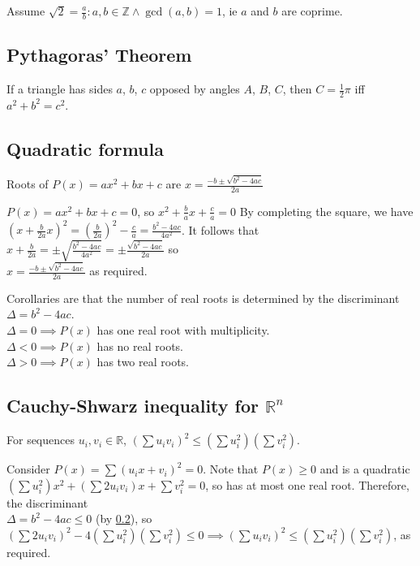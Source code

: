 \documentclass[a4paper,11pt]{article}
\begin{document}
    Assume $\sqrt 2 = \frac ab : a, b \in \mathbb{Z} \land \gcd(a, b) = 1$, ie
    $a$ and $b$ are coprime.

    \subsection{Pythagoras' Theorem} \label{sec:pythagoras}


    If a triangle has sides $a$, $b$, $c$ opposed by angles $A$, $B$, $C$,
    then $C = \frac 12 \pi$ iff $a^2 + b^2 = c^2$.

    \subsection{Quadratic formula} \label{sec:quad_formula}

    Roots of $P(x) = ax^2 + bx + c$ are
    $x = \frac{-b \pm \sqrt{b^2 - 4ac}}{2a}$

    $P(x) = ax^2 + bx + c = 0$, so $x^2 + \frac{b}{a}x + \frac{c}{a} = 0$
    By completing the square, we have
    \\$(x + \frac{b}{2a}x)^2 = (\frac{b}{2a})^2 - \frac{c}{a}
    = \frac{b^2 - 4ac}{4a^2}$. It follows that
    \\$x + \frac{b}{2a} = \pm \sqrt{\frac{b^2 - 4ac}{4a^2}}
    = \pm \frac{\sqrt{b^2 - 4ac}}{2a}$ so
    \\$x = \frac{-b \pm \sqrt{b^2 - 4ac}}{2a}$ as required.

    Corollaries are that the number of real roots is determined by the
    discriminant \\$\Delta = b^2 - 4ac$.
    \\$\Delta = 0 \implies P(x)$ has one real root with multiplicity.
    \\$\Delta < 0 \implies P(x)$ has no real roots.
    \\$\Delta > 0 \implies P(x)$ has two real roots.

    \subsection{Cauchy-Shwarz inequality for $\mathbb{R}^n$}

    For sequences $u_i, v_i \in \mathbb{R}$,
    $(\sum u_i v_i)^2 \le (\sum u_i^2) (\sum v_i^2)$.

    Consider
    $P(x) = \sum (u_i x + v_i)^2 = 0$. Note that $P(x) \ge 0$ and is a quadratic
    \\$(\sum u_i^2) x^2 + (\sum 2 u_i v_i) x + \sum v_i^2 = 0$, so has
    at most one real root. Therefore, the discriminant
    \\$\Delta = b^2 - 4ac \le 0$ (by \ref{sec:quad_formula}), so
    $(\sum 2 u_i v_i)^2 - 4(\sum u_i^2)(\sum v_i^2) \le 0 \implies
     (\sum u_i v_i)^2 \le (\sum u_i^2) (\sum v_i^2)$, as required.
\end{document}
